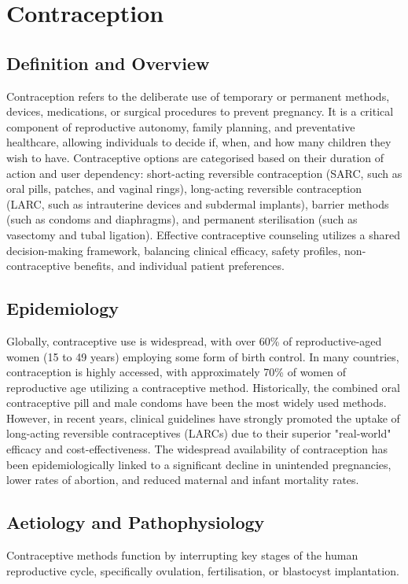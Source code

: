 \chapter{Contraception}

\section*{Definition and Overview}
Contraception refers to the deliberate use of temporary or permanent methods, devices, medications, or surgical procedures to prevent pregnancy. It is a critical component of reproductive autonomy, family planning, and preventative healthcare, allowing individuals to decide if, when, and how many children they wish to have. Contraceptive options are categorised based on their duration of action and user dependency: short-acting reversible contraception (SARC, such as oral pills, patches, and vaginal rings), long-acting reversible contraception (LARC, such as intrauterine devices and subdermal implants), barrier methods (such as condoms and diaphragms), and permanent sterilisation (such as vasectomy and tubal ligation). Effective contraceptive counseling utilizes a shared decision-making framework, balancing clinical efficacy, safety profiles, non-contraceptive benefits, and individual patient preferences.

\section*{Epidemiology}
Globally, contraceptive use is widespread, with over 60\% of reproductive-aged women (15 to 49 years) employing some form of birth control. In many countries, contraception is highly accessed, with approximately 70\% of women of reproductive age utilizing a contraceptive method. Historically, the combined oral contraceptive pill and male condoms have been the most widely used methods. However, in recent years, clinical guidelines have strongly promoted the uptake of long-acting reversible contraceptives (LARCs) due to their superior "real-world" efficacy and cost-effectiveness. The widespread availability of contraception has been epidemiologically linked to a significant decline in unintended pregnancies, lower rates of abortion, and reduced maternal and infant mortality rates.

\section*{Aetiology and Pathophysiology}
Contraceptive methods function by interrupting key stages of the human reproductive cycle, specifically ovulation, fertilisation, or blastocyst implantation.

